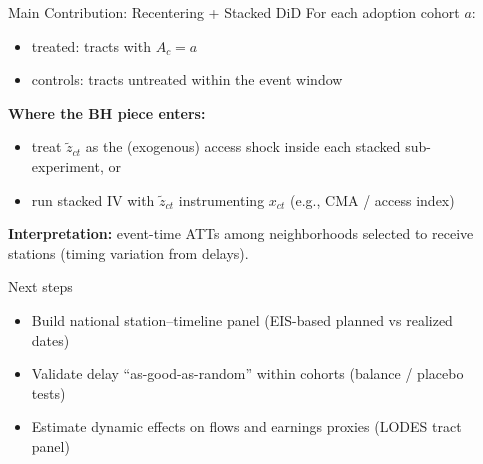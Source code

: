 \documentclass[final]{beamer}
\newlength{\sepwidth}
\newlength{\colwidth}
\newcommand{\separatorcolumn}{\begin{column}{\sepwidth}\end{column}}
\begin{document}
\begin{frame}[t]
\begin{columns}[t]
\begin{column}{\colwidth}
\begin{block}{Main Contribution: Recentering + Stacked DiD}
  \vspace{0.4em}
  For each adoption cohort $a$:
  \begin{itemize}
    \item treated: tracts with $A_c=a$
    \item controls: tracts untreated within the event window
  \end{itemize}

  \vspace{0.6em}
  \textbf{Where the BH piece enters:}
  \begin{itemize}
    \item treat $\tilde z_{ct}$ as the (exogenous) access shock inside each stacked sub-experiment, or
    \item run stacked IV with $\tilde z_{ct}$ instrumenting $x_{ct}$ (e.g., CMA / access index)
  \end{itemize}

  \vspace{0.4em}
  \textbf{Interpretation:} event-time ATTs among neighborhoods selected to receive stations (timing variation from delays).
  \end{block}

  \begin{block}{Next steps}
  \begin{itemize}
    \item Build national station--timeline panel (EIS-based planned vs realized dates)
    \item Validate delay “as-good-as-random” within cohorts (balance / placebo tests)
    \item Estimate dynamic effects on flows and earnings proxies (LODES tract panel)
  \end{itemize}
  \end{block}


\end{column}

\separatorcolumn
\end{columns}
\end{frame}
\end{document}
